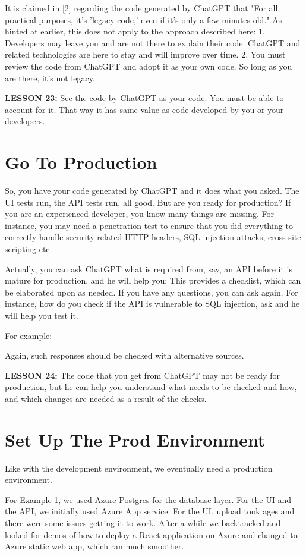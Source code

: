 \documentclass[runningheads]{llncs}
\begin{document}
It is claimed in [2] regarding the code generated by ChatGPT that "For all practical purposes, it's 'legacy code,' even if it's only a few minutes old." As hinted at earlier, this does not apply to the approach described here:
1. Developers may leave you and are not there to explain their code. ChatGPT and related technologies are here to stay and will improve over time.
2. You must review the code from ChatGPT and adopt it as your own code. So long as you are there, it's not legacy.

\textbf{LESSON 23:} See the code by ChatGPT as your code. You must be able to account for it. That way it has same value as code developed by you or your developers.

\section{Go To Production}
So, you have your code generated by ChatGPT and it does what you asked. The UI tests run, the API tests run, all good. But are you ready for production?
If you are an experienced developer, you know many things are missing. For instance, you may need a penetration test to ensure that you did everything to correctly handle 
security-related HTTP-headers, SQL injection attacks, cross-site scripting etc.

Actually, you can ask ChatGPT what is required from, say, an API before it is mature for production, and he will help you:
This provides a checklist, which can be elaborated upon as needed. If you have any questions, you can ask again. For instance, how do you check if the API is vulnerable to SQL injection, ask and he will help you test it.

For example:
  
Again, such responses should be checked with alternative sources.

\textbf{LESSON 24:} The code that you get from ChatGPT may not be ready for production, but he can help you understand what needs to be checked and how, and which changes are needed as a result of the checks.

\section{Set Up The Prod Environment}

Like with the development environment, we eventually need a production environment.

For Example 1, we used Azure Postgres for the database layer. For the UI and the API, we initially used Azure App service. For the UI, upload took ages and there were some issues getting it to work. After a while we backtracked and looked for demos of how to deploy a React application on Azure and changed to Azure static web app, which ran much smoother.
\end{document}

